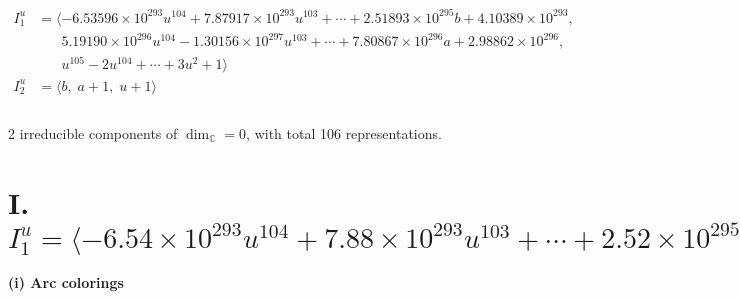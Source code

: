 \documentclass[1p]{elsarticle_modified}
\theoremstyle{definition}
\begin{document}
\begin{align*}
I^u_{1}&=\langle 
-6.53596\times10^{293} u^{104}+7.87917\times10^{293} u^{103}+\cdots+2.51893\times10^{295} b+4.10389\times10^{293},\\
\phantom{I^u_{1}}&\phantom{= \langle  }5.19190\times10^{296} u^{104}-1.30156\times10^{297} u^{103}+\cdots+7.80867\times10^{296} a+2.98862\times10^{296},\\
\phantom{I^u_{1}}&\phantom{= \langle  }u^{105}-2 u^{104}+\cdots+3 u^2+1\rangle \\
I^u_{2}&=\langle 
b,\;a+1,\;u+1\rangle \\
\\
\end{align*}
\raggedright * 2 irreducible components of $\dim_{\mathbb{C}}=0$, with total 106 representations.\\
\newpage
\renewcommand{\arraystretch}{1}
\centering \section*{I. $I^u_{1}= \langle -6.54\times10^{293} u^{104}+7.88\times10^{293} u^{103}+\cdots+2.52\times10^{295} b+4.10\times10^{293},\;5.19\times10^{296} u^{104}-1.30\times10^{297} u^{103}+\cdots+7.81\times10^{296} a+2.99\times10^{296},\;u^{105}-2 u^{104}+\cdots+3 u^2+1 \rangle$}
\flushleft \textbf{(i) Arc colorings}\\
\end{document}
